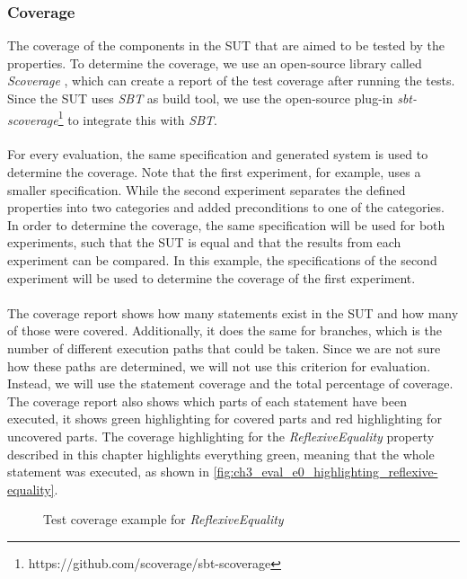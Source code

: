 \subsubsection{Coverage}
The coverage of the components in the SUT that are aimed to be tested by the properties. To determine the coverage, we use an open-source library called \textit{Scoverage} \cite{siteScoverage2017}, which can create a report of the test coverage after running the tests. Since the SUT uses \textit{SBT} as build tool, we use the open-source plug-in \textit{sbt-scoverage}\footnote{https://github.com/scoverage/sbt-scoverage} to integrate this with \textit{SBT}.\\
\\
For every evaluation, the same specification and generated system is used to determine the coverage. Note that the first experiment, for example, uses a smaller specification. While the second experiment separates the defined properties into two categories and added preconditions to one of the categories. In order to determine the coverage, the same specification will be used for both experiments, such that the SUT is equal and that the results from each experiment can be compared. In this example, the specifications of the second experiment will be used to determine the coverage of the first experiment.\\
\\
The coverage report shows how many statements exist in the SUT and how many of those were covered. Additionally, it does the same for branches, which is the number of different execution paths that could be taken. Since we are not sure how these paths are determined, we will not use this criterion for evaluation. Instead, we will use the statement coverage and the total percentage of coverage. The coverage report also shows which parts of each statement have been executed, it shows green highlighting for covered parts and red highlighting for uncovered parts. The coverage highlighting for the \textit{ReflexiveEquality} property described in this chapter highlights everything green, meaning that the whole statement was executed, as shown in \autoref{fig:ch3_eval_e0_highlighting_reflexive-equality}.
\FloatBarrier
\begin{figure}[h!]
\caption{Test coverage example for \textit{ReflexiveEquality}}
\label{fig:ch3_eval_e0_highlighting_reflexive-equality}
\centering
\end{figure}
